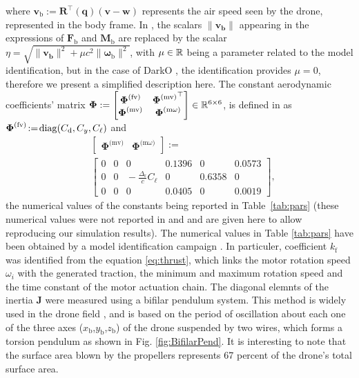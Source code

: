 where $\boldsymbol{v}_{\text{b}} := \boldsymbol{R}^\top(\boldsymbol{q}) (\boldsymbol{v}-\boldsymbol{w})$ represents the air speed seen by the drone, represented in the body frame. In \cite{lustosa:hal-03035938}, the scalars $\lVert \boldsymbol{v_{\text{b}}} \rVert$ appearing in the expressions of $\boldsymbol{F}_{\text{b}}$ and $\boldsymbol{M}_{\text{b}}$ are replaced by the scalar $\eta = \sqrt{\lVert \boldsymbol{v_{\text{b}}} \rVert^{2} + \mu c^{2} \lVert \boldsymbol{\omega}_{\text{b}} \rVert^{2}}$, with $\mu \in {\mathbb R}$ being a parameter related to the model identification, but in the case of DarkO \cite{sansou:stage}, the identification provides $\mu = 0$, therefore we present a simplified description here. The constant aerodynamic coefficients' matrix 
$\boldsymbol{\Phi}:= \begin{bmatrix} \boldsymbol{\Phi}^{\text{(fv)}} & {\boldsymbol{\Phi}^{\text{(mv)}}}^\top \\ \boldsymbol{\Phi}^{\text{(mv)}} & \boldsymbol{\Phi}^{\text{(m$\omega$)}} \end{bmatrix} \in {\mathbb R}^{6 \times 6}$, is defined in \cite[eqs. (6)--(9)]{olszaneckibarth:hal-02542982} as $ \boldsymbol{\Phi}^{\text{(fv)}} \!:=\! \operatorname{diag}(C_{\text{d}},C_{y}, C_{\ell})$ and
\begin{align*}
&\left[ \begin{array}{c|c}
    \boldsymbol{\Phi}^{\text{(mv)}}  &  \boldsymbol{\Phi}^{\text{(m$\omega$)}} 
\end{array}\right] :=\\ 
&\left[ \begin{array}{ccc|ccc}
    0 & 0 & 0    &                                          0.1396 & 0 & 0.0573 \\
    0 & 0 & \!\!\!\!\! -\frac{\Delta_{\text{r}}}{c}C_{\ell} &    0 &  0.6358  & 0 \\
    0 & 0 & 0 &     0.0405 & 0 & 0.0019 
\end{array}\right],
\end{align*}
the numerical values of the constants being reported in Table~\ref{tab:pars} (these numerical values were not reported in \cite{lustosa:hal-03035938} and \cite{olszaneckibarth:hal-02542982} and are given here to allow reproducing our simulation results). The numerical values in Table \ref{tab:pars} have been obtained by a model identification campaign \cite{sansou:stage}. In particuler, coefficient $k_{\text{f}}$ was identified from the equation \eqref{eq:thrust}, which links the motor rotation speed $\omega_{i}$ with the generated traction, the minimum and maximum rotation speed and the time constant of the motor actuation chain. The diagonal elemnts of the inertia $\boldsymbol{J}$ were measured using a bifilar pendulum system. This method is widely used in the drone field \cite{Jardin2007OptimizedMO}, and is based on the period of oscillation about each one of the three axes ($x_{\text{b}}$,$y_{\text{b}}$,$z_{\text{b}}$) of the drone suspended by two wires, which forms a torsion pendulum as shown in Fig. \ref{fig:BifilarPend}.
It is interesting to note that the surface area blown by the propellers represents 67 percent of the drone's total surface area.


